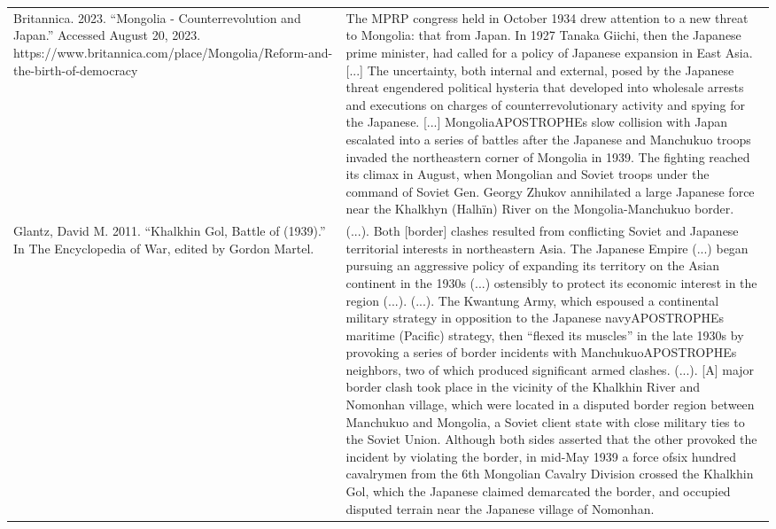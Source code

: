 {\begin{longtable}{p{}p{}}
Britannica. 2023. “Mongolia - Counterrevolution and Japan.” Accessed August 20, 2023. https://www.britannica.com/place/Mongolia/Reform-and-the-birth-of-democracy & The MPRP congress held in October 1934 drew attention to a new threat to Mongolia: that from Japan. In 1927 Tanaka Giichi, then the Japanese prime minister, had called for a policy of Japanese expansion in East Asia. [...] The uncertainty, both internal and external, posed by the Japanese threat engendered political hysteria that developed into wholesale arrests and executions on charges of counterrevolutionary activity and spying for the Japanese. [...] MongoliaAPOSTROPHEs slow collision with Japan escalated into a series of battles after the Japanese and Manchukuo troops invaded the northeastern corner of Mongolia in 1939. The fighting reached its climax in August, when Mongolian and Soviet troops under the command of Soviet Gen. Georgy Zhukov annihilated a large Japanese force near the Khalkhyn (Halhïn) River on the Mongolia-Manchukuo border.
\\
Glantz, David M. 2011. “Khalkhin Gol, Battle of (1939).” In The Encyclopedia of War, edited by Gordon Martel. & (...). Both [border] clashes resulted from conflicting Soviet and Japanese territorial interests in northeastern Asia. The Japanese Empire (...) began pursuing an aggressive policy of expanding its territory on the Asian continent in the 1930s (...) ostensibly to protect its economic interest in the region (...). (...).
The Kwantung Army, which espoused a continental military strategy in opposition to the Japanese navyAPOSTROPHEs maritime (Pacific) strategy, then “flexed its muscles” in the late 1930s by provoking a series of border incidents with ManchukuoAPOSTROPHEs neighbors, two of which produced significant armed clashes. (...).
[A] major border clash took place in the vicinity of the Khalkhin River and Nomonhan village, which were located in a disputed border region between Manchukuo and Mongolia, a Soviet client state with close military ties to the Soviet Union. Although both sides asserted that the other provoked the incident by violating the border, in mid-May 1939 a force ofsix hundred cavalrymen from the 6th Mongolian Cavalry Division crossed the Khalkhin Gol, which the Japanese claimed demarcated the border, and occupied disputed terrain near the Japanese village of Nomonhan.
\\

\end{longtable}}

